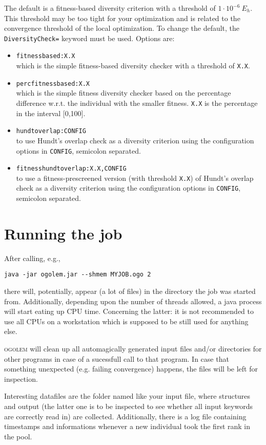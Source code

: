 \documentclass[a4paper,10pt]{scrbook}
\newcommand{\ogo}{\textsc{ogolem}}
\begin{document}
The default is a fitness-based diversity criterion with a threshold of 
$1\cdot10^{-6}\:E_h$. This threshold may be too tight for your optimization and 
is related to the convergence threshold of the local optimization. To change 
the default, the \texttt{DiversityCheck=} keyword must be used. Options are:
\begin{itemize}
  \item \texttt{fitnessbased:X.X}\\
    which is the simple fitness-based diversity checker with a threshold of 
\texttt{X.X}.
  \item \texttt{percfitnessbased:X.X}\\
   which is the simple fitness diversity checker based on the percentage 
difference w.r.t. the individual with the smaller fitness. \texttt{X.X} is the 
percentage in the interval [0,100].
  \item \texttt{hundtoverlap:CONFIG}\\
    to use Hundt's overlap check as a diversity criterion using the 
configuration options in \texttt{CONFIG}, semicolon separated.
  \item \texttt{fitnesshundtoverlap:X.X,CONFIG}\\
    to use a fitness-prescreened version (with threshold \texttt{X.X}) of 
Hundt's overlap check as a diversity criterion using the configuration options 
in \texttt{CONFIG}, semicolon separated.
\end{itemize}


\section{Running the job}
After calling, e.g.,
\begin{verbatim}
java -jar ogolem.jar --shmem MYJOB.ogo 2
\end{verbatim}
there will, potentially, appear (a lot of files) in the directory the job was 
started from. Additionally, depending upon the number of threads allowed, a 
java process will start eating up CPU time. Concerning the latter: it is not 
recommended to use all CPUs on a workstation which is supposed to be still used 
for anything else.

\ogo{} will clean up all automagically generated input files and/or directories
for other programs in case of a sucessfull call to that program. In case that
something unexpected (e.g. failing convergence) happens, the files will be left
for inspection.

Interesting datafiles are the folder named like your input file, where
structures and output (the latter one is to be inspected to see whether all
input keywords are correctly read in) are collected. Additionally, there is a
log file containing timestamps and informations whenever a new individual took
the first rank in the pool.
\end{document}
